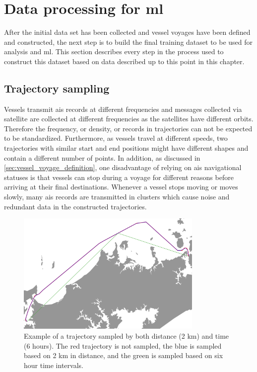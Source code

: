 \section{Data processing for \acrfull{ml}}

After the initial data set has been collected and vessel voyages have been defined and constructed, the next step is to build the final training dataset to be used for analysis and \acrfull{ml}. This section describes every step in the process used to construct this dataset based on data described up to this point in this chapter.

\subsection{Trajectory sampling}
\label{sec:trajectory_sampling}

Vessels transmit \acrshort{ais} records at different frequencies and messages collected via satellite are collected at different frequencies as the satellites have different orbits. Therefore the frequency, or density, or records in trajectories can not be expected to be standardized. Furthermore, as vessels travel at different speeds, two trajectories with similar start and end positions might have different shapes and contain a different number of points. In addition, as discussed in \cref{sec:vessel_voyage_definition}, one disadvantage of relying on \acrshort{ais} navigational statuses is that vessels can stop during a voyage for different reasons before arriving at their final destinations. Whenever a vessel stops moving or moves slowly, many \acrshort{ais} records are transmitted in clusters which cause noise and redundant data in the constructed trajectories.

\begin{figure}[htbp]  %
    \centering
    \includegraphics[width=0.8\textwidth]{figures/trajectory_sampling}
    \caption{Example of a trajectory sampled by both distance (2 km) and time (6 hours). The red trajectory is not sampled, the blue is sampled based on 2 km in distance, and the green is sampled based on six hour time intervals.}
    \label{fig:trajectory_sampling}
\end{figure}

